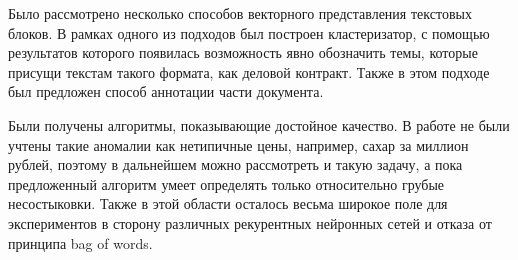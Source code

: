 \documentclass[12pt]{article}
\begin{document}
Было рассмотрено несколько способов векторного представления текстовых блоков. В рамках одного из подходов был построен кластеризатор, с помощью результатов которого появилась возможность явно обозначить темы, которые присущи текстам такого формата, как деловой контракт. Также в этом подходе был предложен способ аннотации части документа. 

Были получены алгоритмы, показывающие достойное качество. В работе не были учтены такие аномалии как нетипичные цены, например, сахар за миллион рублей, поэтому в дальнейшем можно рассмотреть и такую задачу, а пока предложенный алгоритм умеет определять только относительно грубые несостыковки. Также в этой области осталось весьма широкое поле для экспериментов в сторону различных рекурентных нейронных сетей и отказа от принципа bag of words.

\newpage
\end{document}
